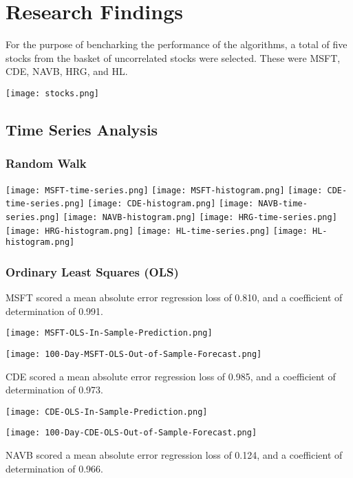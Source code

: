 \chapter{Research Findings}
For the purpose of bencharking the performance of the algorithms, a total of five stocks from the basket of uncorrelated stocks were selected. These were MSFT, CDE, NAVB, HRG, and HL. 

\texttt{[image: stocks.png]}

\section{Time Series Analysis}

\subsection{Random Walk}
\texttt{[image: MSFT-time-series.png]}
\texttt{[image: MSFT-histogram.png]}
\texttt{[image: CDE-time-series.png]}
\texttt{[image: CDE-histogram.png]}
\texttt{[image: NAVB-time-series.png]}
\texttt{[image: NAVB-histogram.png]}
\texttt{[image: HRG-time-series.png]}
\texttt{[image: HRG-histogram.png]}
\texttt{[image: HL-time-series.png]}
\texttt{[image: HL-histogram.png]}

\subsection{Ordinary Least Squares (OLS)}
MSFT scored a mean absolute error regression loss of 0.810, and a coefficient of determination of 0.991.

\texttt{[image: MSFT-OLS-In-Sample-Prediction.png]}

\texttt{[image: 100-Day-MSFT-OLS-Out-of-Sample-Forecast.png]}

CDE scored a mean absolute error regression loss of 0.985, and a coefficient of determination of 0.973.

\texttt{[image: CDE-OLS-In-Sample-Prediction.png]}

\texttt{[image: 100-Day-CDE-OLS-Out-of-Sample-Forecast.png]}

NAVB scored a mean absolute error regression loss of 0.124, and a coefficient of determination of 0.966.

